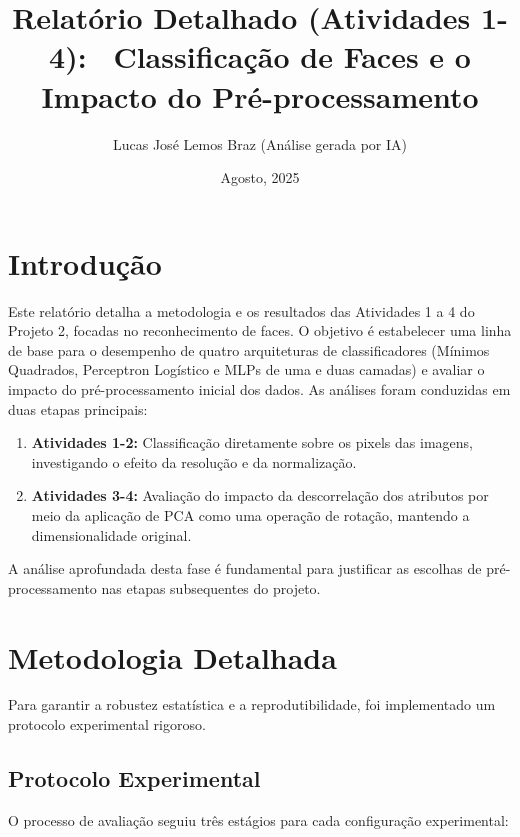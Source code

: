 \documentclass[a4paper,12pt]{article}
\title{Relatório Detalhado (Atividades 1-4): \ Classificação de Faces e o Impacto do Pré-processamento}
\author{Lucas José Lemos Braz (Análise gerada por IA)}
\date{Agosto, 2025}
\begin{document}
\maketitle

\section{Introdução}

Este relatório detalha a metodologia e os resultados das Atividades 1 a 4 do Projeto 2, focadas no reconhecimento de faces. O objetivo é estabelecer uma linha de base para o desempenho de quatro arquiteturas de classificadores (Mínimos Quadrados, Perceptron Logístico e MLPs de uma e duas camadas) e avaliar o impacto do pré-processamento inicial dos dados. As análises foram conduzidas em duas etapas principais:
\begin{enumerate}
    \item \textbf{Atividades 1-2:} Classificação diretamente sobre os pixels das imagens, investigando o efeito da resolução e da normalização.
    \item \textbf{Atividades 3-4:} Avaliação do impacto da descorrelação dos atributos por meio da aplicação de PCA como uma operação de rotação, mantendo a dimensionalidade original.
\end{enumerate}
A análise aprofundada desta fase é fundamental para justificar as escolhas de pré-processamento nas etapas subsequentes do projeto.

\section{Metodologia Detalhada}

Para garantir a robustez estatística e a reprodutibilidade, foi implementado um protocolo experimental rigoroso.

\subsection{Protocolo Experimental}
O processo de avaliação seguiu três estágios para cada configuração experimental:
\end{document}
